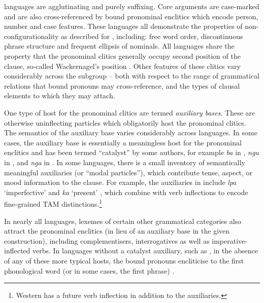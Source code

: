 \documentclass[output=paper,colorlinks,citecolor=brown]{langscibook}
\begin{document}
 languages are agglutinating and purely suffixing. Core arguments are case-marked and are also cross-referenced by bound pronominal enclitics which encode person, number and case features. These languages all demonstrate the properties of non-configurationality as described for  \citep{hale_warlpiri_1983}, including: free word order, discontinuous phrase structure and frequent ellipsis of nominals. All  languages share the property that the pronominal clitics generally occupy second position of the clause, so-called Wackernagel's position \citep{wackernagel_uber_1892}. Other features of these clitics vary considerably across the subgroup -- both with respect to the range of grammatical relations that bound pronouns may cross-reference, and the types of clausal elements to which they may attach.

One type of host for the pronominal clitics are termed \textit{auxiliary bases}. These are otherwise uninflecting particles which obligatorily host the pronominal clitics. The semantics of the auxiliary base varies considerably across languages. In some cases, the auxiliary base is essentially a meaningless host for the pronominal enclitics and has been termed ``catalyst'' by some authors, for example \textit{ba} in  \citep[68--69]{capell_new_1956}, \textit{ngu} in  \citep{mcconvell_functions_1996}, and \textit{nga} in  \citep[30]{jones_ngarinyman_2019}. In some  languages, there is a small inventory of semantically meaningful auxiliaries (or ``modal particles''), which contribute tense, aspect, or mood information to the clause. For example, the auxiliaries in  include \textit{lpa} `imperfective' and \textit{ka} `present' \citep{laughren_revised_2013}, which combine with verb inflections to encode fine-grained TAM distinctions.\footnote{Western  has a future verb inflection in addition to the auxiliaries.} 

In nearly all  languages, lexemes of certain other grammatical categories also attract the pronominal enclitics (in lieu of an auxiliary base in the given construction), including complementisers, interrogatives as well as imperative-inflected verbs. In languages without a catalyst auxiliary, such as , in the absence of any of these more typical hosts, the bound pronouns encliticise to the first phonological word (or in some cases, the first phrase) \citep[310--313]{ennever_grammar_2021}.
\end{document}
